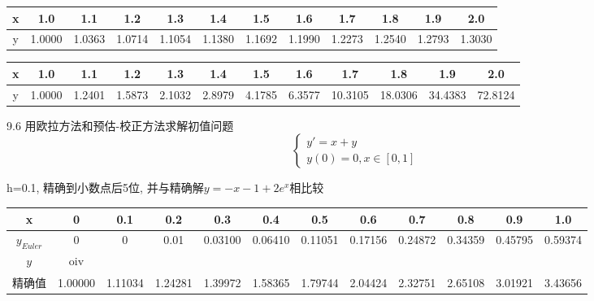 \documentclass[a4paper, 10pt]{article}
\begin{document}
\begin{CJK}{UTF8}{gbsn}

\begin{tabular}{c|c c c c c c c c c c c}
\hline
 x & 1.0 & 1.1 & 1.2 & 1.3 & 1.4 & 1.5 & 1.6 & 1.7 & 1.8 & 1.9 & 2.0 \\
 \hline
 y & 1.0000 & 1.0363 & 1.0714 & 1.1054 & 1.1380 & 1.1692 & 1.1990 & 1.2273 & 1.2540 & 1.2793 & 1.3030 \\
 \hline
\end{tabular}


\begin{tabular}{c|c c c c c c c c c c c}
\hline
 x & 1.0 & 1.1 & 1.2 & 1.3 & 1.4 & 1.5 & 1.6 & 1.7 & 1.8 & 1.9 & 2.0 \\
\hline
y & 1.0000 & 1.2401 & 1.5873 & 2.1032 & 2.8979 & 4.1785 & 6.3577 & 10.3105 & 18.0306 & 34.4383 & 72.8124 \\
\hline
\end{tabular}

9.6
用欧拉方法和预估-校正方法求解初值问题
\begin{equation}
	\begin{cases}
		y' = x+y \\
		y(0) = 0, x\in[0,1]
	\end{cases}
\end{equation}

h=0.1, 精确到小数点后5位, 并与精确解$y=-x-1+2e^x$相比较

\begin{tabular}{c|c c c c c c c c c c c}
\hline
x & 0 & 0.1 & 0.2 & 0.3 & 0.4 & 0.5 & 0.6 & 0.7 & 0.8 & 0.9 & 1.0 \\
\hline
$y_{Euler}$ & 0 & 0 & 0.01 & 0.03100 & 0.06410 & 0.11051 & 0.17156 & 0.24872 & 0.34359 & 0.45795 & 0.59374 \\
$y_{}$ & oiv \\
\hline
精确值 & 1.00000 & 1.11034 & 1.24281 & 1.39972 & 1.58365 & 1.79744 & 2.04424 & 2.32751 & 2.65108 & 3.01921 & 3.43656 \\
\hline

\end{tabular}
\end{CJK}
\end{document}
